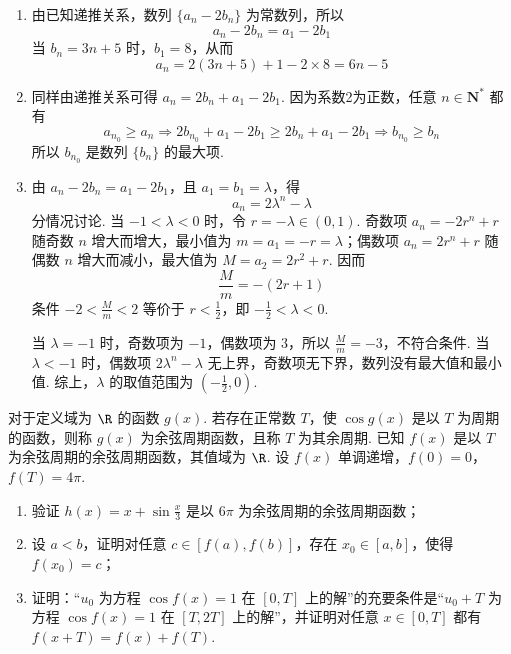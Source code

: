 \begin{solution}
\begin{enumerate}
\item 由已知递推关系，数列 \(\{a_n-2b_n\}\) 为常数列，所以
\[
a_n-2b_n=a_1-2b_1
\]
当 \(b_n=3n+5\) 时，\(b_1=8\)，从而
\[
a_n=2(3n+5)+1-2\times8=6n-5
\]

\item 同样由递推关系可得 \(a_n=2b_n+a_1-2b_1\). 因为系数2为正数，任意 \(n\in\mathbf N^*\) 都有
\[
a_{n_0}\geqslant a_n
\Longrightarrow 2b_{n_0}+a_1-2b_1\geqslant2b_n+a_1-2b_1
\Longrightarrow b_{n_0}\geqslant b_n
\]
所以 \(b_{n_0}\) 是数列 \(\{b_n\}\) 的最大项.

\item 由 \(a_n-2b_n=a_1-2b_1\)，且 \(a_1=b_1=\lambda\)，得
\[
a_n=2\lambda^n-\lambda
\]
分情况讨论. 当 \(-1<\lambda<0\) 时，令 \(r=-\lambda\in(0,1)\). 奇数项 \(a_n=-2r^n+r\) 随奇数 \(n\) 增大而增大，最小值为 \(m=a_1=-r=\lambda\)；偶数项 \(a_n=2r^n+r\) 随偶数 \(n\) 增大而减小，最大值为 \(M=a_2=2r^2+r\). 因而
\[
\frac{M}{m}=-(2r+1)
\]
条件 \(-2<\frac Mm<2\) 等价于 \(r<\frac12\)，即 \(-\frac12<\lambda<0\).

当 \(\lambda=-1\) 时，奇数项为 \(-1\)，偶数项为 \(3\)，所以 \(\frac Mm=-3\)，不符合条件. 当 \(\lambda<-1\) 时，偶数项 \(2\lambda^n-\lambda\) 无上界，奇数项无下界，数列没有最大值和最小值. 综上，\(\lambda\) 的取值范围为 \(\left(-\frac12,0\right)\).
\end{enumerate}
\end{solution}

\begin{problem}
对于定义域为 \(\R\) 的函数 \(g(x)\). 若存在正常数 \(T\)，使 \(\cos g(x)\) 是以 \(T\) 为周期的函数，则称 \(g(x)\) 为余弦周期函数，且称 \(T\) 为其余周期. 已知 \(f(x)\) 是以 \(T\) 为余弦周期的余弦周期函数，其值域为 \(\R\). 设 \(f(x)\) 单调递增，\(f(0) = 0\)，\(f(T) = 4\pi\).
\begin{enumerate}
\item 验证 \( h(x) = x + \sin \frac{x}{3} \) 是以 \( 6\pi \) 为余弦周期的余弦周期函数；
\item 设 \( a < b \)，证明对任意 \( c \in [f(a), f(b)]\)，存在 \( x_0 \in [a, b] \)，使得 \( f(x_0) = c\)；
\item 证明：“\( u_0 \) 为方程 \( \cos f(x) = 1 \) 在 \([0, T]\) 上的解”的充要条件是“\( u_0 + T \) 为方程 \( \cos f(x) = 1 \) 在 \([T, 2T]\) 上的解”，并证明对任意 \( x \in [0, T] \) 都有 \( f(x + T) = f(x) + f(T) \).
\end{enumerate}
\end{problem}

